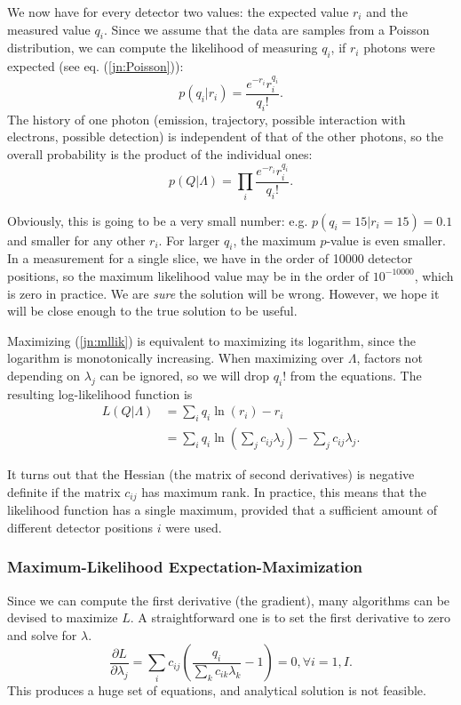 \documentclass[11pt,oneside]{book}
\begin{document}
We now have for every detector two values: the expected value $r_i$ and the
measured value $q_i$. Since we assume that the data are samples from a Poisson
distribution, we can compute the likelihood of measuring $q_i$, if $r_i$
photons were expected (see eq. (\ref{jn:Poisson})):
\begin{equation}
  p(q_i | r_i) = \frac{e^{-r_i} r_i^{q_i}}{q_i!}.
\end{equation}
The history of one photon (emission, trajectory, possible interaction with
electrons, possible detection) is independent of that of the other photons, so
the overall probability is the product of the individual ones:
\begin{equation}
  p(Q | \Lambda) = \prod_i \frac{e^{-r_i} r_i^{q_i}}{q_i!}. \label{jn:mllik}
\end{equation}

Obviously, this is going to be a very small number: e.g. $p(q_i = 15 | r_i =
15) = 0.1$ and smaller for any other $r_i$. For larger $q_i$, the maximum
$p$-value is even smaller. In a measurement for a single slice, we have in the
order of 10000 detector positions, so the maximum likelihood value may be in
the order of $10^{-10000}$, which is zero in practice. We are {\em sure} the
solution will be wrong. However, we hope it will be close enough to the true
solution to be useful.

Maximizing (\ref{jn:mllik}) is equivalent to maximizing its logarithm, since
the logarithm is monotonically increasing. When maximizing over $\Lambda$,
factors not depending on $\lambda_j$ can be ignored, so we will drop $q_i!$
from the equations. The resulting log-likelihood function is
\begin{align}
  L(Q | \Lambda) &= \sum_i q_i \ln(r_i) - r_i \\
        &= \sum_i q_i \ln(\sum_j c_{ij} \lambda_j) - \sum_j c_{ij}
           \lambda_j. \label{eq:likelihood}
\end{align}

It turns out that the Hessian (the matrix of second derivatives) is negative
definite if the matrix $c_{ij}$ has maximum rank. In practice, this means that
the likelihood function has a single maximum, provided that a sufficient amount
of different detector positions $i$ were used.

\subsubsection{Maximum-Likelihood Expectation-Maximization}
Since we can compute the first derivative (the gradient), many algorithms can
be devised to maximize $L$. A straightforward one is to set the first
derivative to zero and solve for $\lambda$.
\begin{equation}
 \frac{\partial L}{\partial \lambda_j} = \sum_i c_{ij} \left(
      \frac{q_i}{\sum_k c_{ik} \lambda_k} - 1 \right) = 0, \forall i = 1,I.
       \label{eq:jnmlgrad}
\end{equation}
This produces a huge set of equations, and analytical solution is not
feasible.
\end{document}
